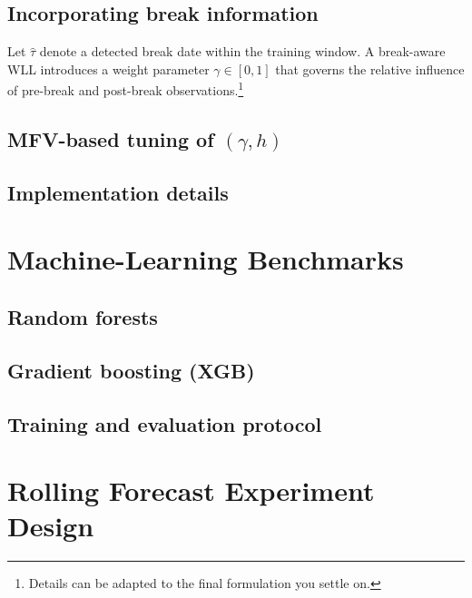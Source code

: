 \documentclass[11pt]{article}
\newcommand{\1}{\mathbf{1}}
\begin{document}
\subsection{Incorporating break information}

Let $\hat{\tau}$ denote a detected break date within the training window. A break-aware WLL introduces a weight parameter $\gamma \in [0,1]$ that governs the relative influence of pre-break and post-break observations.\footnote{Details can be adapted to the final formulation you settle on.}

\subsection{MFV-based tuning of $(\gamma,h)$}

\subsection{Implementation details}

\section{Machine-Learning Benchmarks}
\label{sec:ml-benchmarks}

\subsection{Random forests}

\subsection{Gradient boosting (XGB)}

\subsection{Training and evaluation protocol}

\section{Rolling Forecast Experiment Design}
\label{sec:rolling-design}
\end{document}
